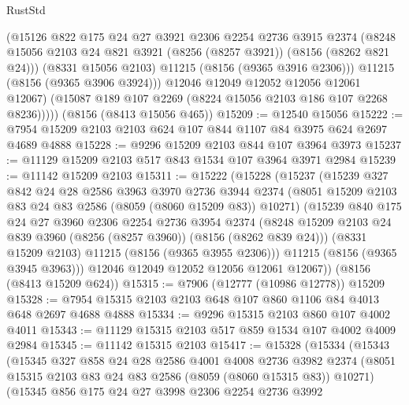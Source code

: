\begin{lexlean}{RustStd}
\begin{coremodule}
              (@15126
                @822
                @175
                @24
                @27
                @3921
                @2306
                @2254
                @2736
                @3915
                @2374
                (@8248 @15056 @2103 @24 @821 @3921 (@8256 (@8257 @3921)) (@8156 (@8262 @821 @24)))
                (@8331 @15056 @2103)
                @11215
                (@8156 (@9365 @3916 @2306)))
              @11215
              (@8156 (@9365 @3906 @3924)))
            @12046
            @12049
            @12052
            @12056
            @12061
            @12067)
          (@15087 @189 @107 @2269 (@8224 @15056 @2103 @186 @107 @2268 @8236)))))
    (@8156 (@8413 @15056 @465))
@15209 := @12540 @15056
@15222 := @7954 @15209 @2103 @2103 @624 @107 @844 @1107 @84 @3975 @624 @2697 @4689 @4888
@15228 := @9296 @15209 @2103 @844 @107 @3964 @3973
@15237 := @11129 @15209 @2103 @517 @843 @1534 @107 @3964 @3971 @2984
@15239 := @11142 @15209 @2103
@15311 := @15222
    (@15228
      (@15237
        (@15239
          @327
          @842
          @24
          @28
          @2586
          @3963
          @3970
          @2736
          @3944
          @2374
          (@8051 @15209 @2103 @83 @24 @83 @2586 (@8059 (@8060 @15209 @83)) @10271)
          (@15239
            @840
            @175
            @24
            @27
            @3960
            @2306
            @2254
            @2736
            @3954
            @2374
            (@8248 @15209 @2103 @24 @839 @3960 (@8256 (@8257 @3960)) (@8156 (@8262 @839 @24)))
            (@8331 @15209 @2103)
            @11215
            (@8156 (@9365 @3955 @2306)))
          @11215
          (@8156 (@9365 @3945 @3963)))
        @12046
        @12049
        @12052
        @12056
        @12061
        @12067))
    (@8156 (@8413 @15209 @624))
@15315 := @7906 (@12777 (@10986 @12778)) @15209
@15328 := @7954 @15315 @2103 @2103 @648 @107 @860 @1106 @84 @4013 @648 @2697 @4688 @4888
@15334 := @9296 @15315 @2103 @860 @107 @4002 @4011
@15343 := @11129 @15315 @2103 @517 @859 @1534 @107 @4002 @4009 @2984
@15345 := @11142 @15315 @2103
@15417 := @15328
    (@15334
      (@15343
        (@15345
          @327
          @858
          @24
          @28
          @2586
          @4001
          @4008
          @2736
          @3982
          @2374
          (@8051 @15315 @2103 @83 @24 @83 @2586 (@8059 (@8060 @15315 @83)) @10271)
          (@15345
            @856
            @175
            @24
            @27
            @3998
            @2306
            @2254
            @2736
            @3992

\end{coremodule}
\end{lexlean}
